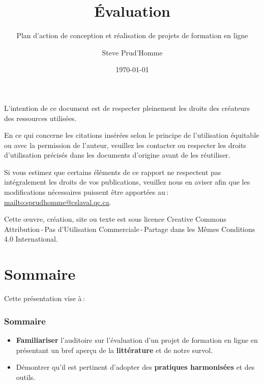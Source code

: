 	\title{Évaluation} 
	\subtitle{Plan d’action de conception et réalisation de projets de formation en ligne}
	\author{Steve Prud'Homme} 
	\date{\today} 

	
	\frame{} 
	\frame{\titlepage} 
    
	\usebackgroundtemplate{ } 
	\par L’intention de ce document est de respecter pleinement les droits des créateurs des ressources
utilisées.
	\par En ce qui concerne les citations insérées selon le principe de l'utilisation équitable ou avec la permission de l'auteur, veuillez les contacter ou respecter les droits d’utilisation précisés dans les documents d’origine avant de les réutiliser.
	\par Si vous estimez que certains éléments de ce rapport ne respectent pas intégralement les droits de vos
publications, veuillez nous en aviser afin que les modifications nécessaires puissent être apportées au\,: \url{mailto:sprudhomme@cslaval.qc.ca}.
	\par Cette \oe uvre, création, site ou texte est sous licence Creative Commons Attribution\,-\,Pas d’Utilisation Commerciale\,-\,Partage dans les Mêmes Conditions 4.0 International.	\section{Sommaire} 
		\begin{frame}
			Cette présentation vise à\,:
			\frametitle{Sommaire}
			\begin {itemize}
				\item \textbf{Familiariser} l'auditoire sur l'évaluation d'un projet de formation en ligne en présentant un bref aperçu de la \textbf{littérature} et de notre survol.
				\item Démontrer qu'il est pertinent d'adopter des \textbf{pratiques harmonisées} et des outils.
				

			\end{itemize}
		\end{frame}


